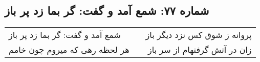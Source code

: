 \begin{center}
\section*{شماره ۷۷: شمع آمد و گفت: گر بما زد پر باز}
\label{sec:077}
\begin{longtable}{l p{0.5cm} r}
شمع آمد و گفت: گر بما زد پر باز
&&
پروانه ز شوق کس نزد دیگر باز
\\
هر لحظه رهی که میروم چون خامم
&&
زان در آتش گرفتهام از سر باز
\\
\end{longtable}
\end{center}
